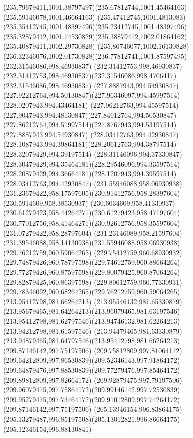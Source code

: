 {{\curveto(235.79679411,1001.38797497)(235.67812744,1001.45464163)(235.59146078,1001.46664163)
\curveto(235.47412745,1001.4813083)(235.35412745,1001.48397496)(235.23412745,1001.48397496)
\curveto(235.32879412,1001.74530829)(235.38879412,1002.01864162)(235.40879411,1002.29730828)
\curveto(235.86746077,1002.16130828)(236.32346076,1002.01730828)(236.77812741,1001.87597495)
\moveto(232.31546086,998.46930837)
\lineto(232.31412753,998.46930837)
\curveto(232.31412753,998.46930837)(232.31546086,998.4706417)(232.31546086,998.46930837)
\closepath
\moveto(227.8887943,994.54930847)
\curveto(227.92212764,994.50130847)(227.96346097,994.45997514)(228.0207943,994.43464181)
\curveto(227.96212763,994.45597514)(227.9047943,994.48130847)(227.84612764,994.50530847)
\curveto(227.86212764,994.51997514)(227.8767943,994.53197514)(227.8887943,994.54930847)
\moveto(228.03412763,994.42930847)
\curveto(228.1087943,994.39864181)(228.20612763,994.38797514)(228.32079429,994.39197514)
\curveto(228.31146096,994.37330847)(228.30479429,994.35464181)(228.29546096,994.33597514)
\curveto(228.20879429,994.36664181)(228.1207943,994.39597514)(228.03412763,994.42930847)
\moveto(231.55946088,958.06930938)
\curveto(231.23679422,958.17597605)(230.91412756,958.28397604)(230.5914609,958.38530937)
\curveto(230.6034609,958.41330937)(230.61279423,958.44264271)(230.61279423,958.47197604)
\curveto(230.77012756,958.41464271)(230.92612756,958.35597604)(231.07279422,958.28797604)
\curveto(231.23146089,958.21597604)(231.39546088,958.14130938)(231.55946088,958.06930938)
\moveto(229.76212759,960.59064265)
\curveto(229.75412759,960.68930932)(229.74879426,960.78797598)(229.74612759,960.88664264)
\curveto(229.77279426,960.87597598)(229.80079425,960.87064264)(229.82879425,960.86397598)
\curveto(229.80612759,960.77330931)(229.78346092,960.68264265)(229.76212759,960.59064265)
\moveto(213.95412798,981.66264213)
\curveto(213.95546132,981.65330879)(213.95679465,981.64264213)(213.96079465,981.63197546)
\curveto(213.95412798,981.62797546)(213.94746132,981.62264213)(213.94212798,981.61597546)
\curveto(213.94479465,981.63330879)(213.94879465,981.64797546)(213.95412798,981.66264213)
\moveto(209.87146142,997.75197506)
\curveto(209.75812809,997.81064172)(209.64212809,997.86530839)(209.52346143,997.91864172)
\curveto(209.64879476,997.88530839)(209.77279476,997.85464172)(209.89812809,997.82664172)
\curveto(209.92879475,997.79197506)(209.96079475,997.75864172)(209.99146142,997.72530839)
\curveto(209.95279475,997.73464172)(209.91012809,997.74264172)(209.87146142,997.75197506)
\moveto(205.13946154,996.83864175)
\curveto(205.13279487,996.85197508)(205.13012821,996.86664175)(205.12346154,996.88130841)
}}
